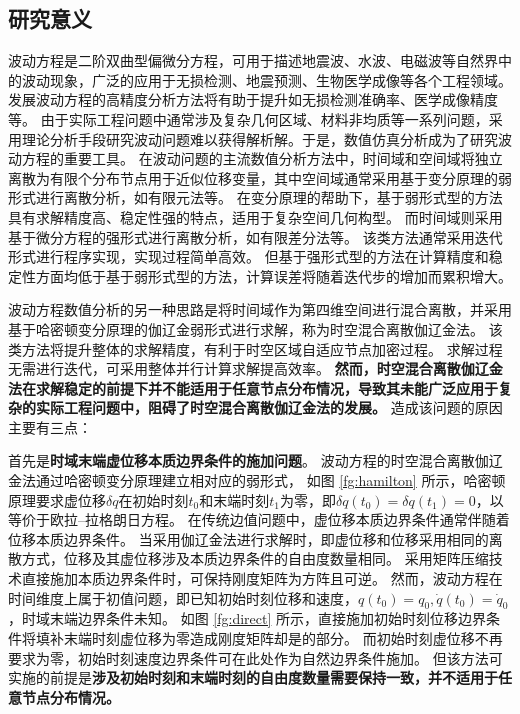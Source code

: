 
\subsection{研究意义}
波动方程是二阶双曲型偏微分方程\cite{bedford1994}，可用于描述地震波、水波、电磁波等自然界中的波动现象，广泛的应用于无损检测、地震预测、生物医学成像等各个工程领域。
发展波动方程的高精度分析方法将有助于提升如无损检测准确率、医学成像精度等。
由于实际工程问题中通常涉及复杂几何区域、材料非均质等一系列问题，采用理论分析手段研究波动问题难以获得解析解。于是，数值仿真分析成为了研究波动方程的重要工具。
在波动问题的主流数值分析方法中\cite{hughes2000}，时间域和空间域将独立离散为有限个分布节点用于近似位移变量，其中空间域通常采用基于变分原理的弱形式进行离散分析，如有限元法等。
在变分原理的帮助下，基于弱形式型的方法具有求解精度高、稳定性强的特点，适用于复杂空间几何构型。
而时间域则采用基于微分方程的强形式进行离散分析，如有限差分法等。
该类方法通常采用迭代形式进行程序实现，实现过程简单高效。
但基于强形式型的方法在计算精度和稳定性方面均低于基于弱形式型的方法，计算误差将随着迭代步的增加而累积增大。

波动方程数值分析的另一种思路是将时间域作为第四维空间进行混合离散，并采用基于哈密顿变分原理的伽辽金弱形式进行求解，称为时空混合离散伽辽金法。
该类方法将提升整体的求解精度，有利于时空区域自适应节点加密过程。
求解过程无需进行迭代，可采用整体并行计算求解提高效率。
\textbf{
然而，时空混合离散伽辽金法在求解稳定的前提下并不能适用于任意节点分布情况，导致其未能广泛应用于复杂的实际工程问题中，阻碍了时空混合离散伽辽金法的发展。
}
造成该问题的原因主要有三点：

首先是\textbf{时域末端虚位移本质边界条件的施加问题}。
波动方程的时空混合离散伽辽金法通过哈密顿变分原理建立相对应的弱形式，
如图 \ref{fg:hamilton} 所示，哈密顿原理要求虚位移$\delta q$在初始时刻$t_0$和末端时刻$t_1$为零，即$\delta q(t_0)=\delta q(t_1)=0$，以等价于欧拉--拉格朗日方程\cite{arnold1978}。
在传统边值问题中，虚位移本质边界条件通常伴随着位移本质边界条件。
当采用伽辽金法进行求解时，即虚位移和位移采用相同的离散方式，位移及其虚位移涉及本质边界条件的自由度数量相同。
采用矩阵压缩技术直接施加本质边界条件时，可保持刚度矩阵为方阵且可逆。
然而，波动方程在时间维度上属于初值问题，即已知初始时刻位移和速度，$q(t_0)=q_0,\dot q(t_0) = \dot q_0$，时域末端边界条件未知。
如图 \ref{fg:direct} 所示，直接施加初始时刻位移边界条件将填补末端时刻虚位移为零造成刚度矩阵却是的部分。
而初始时刻虚位移不再要求为零，初始时刻速度边界条件可在此处作为自然边界条件施加。
但该方法可实施的前提是\textbf{涉及初始时刻和末端时刻的自由度数量需要保持一致，并不适用于任意节点分布情况。}

